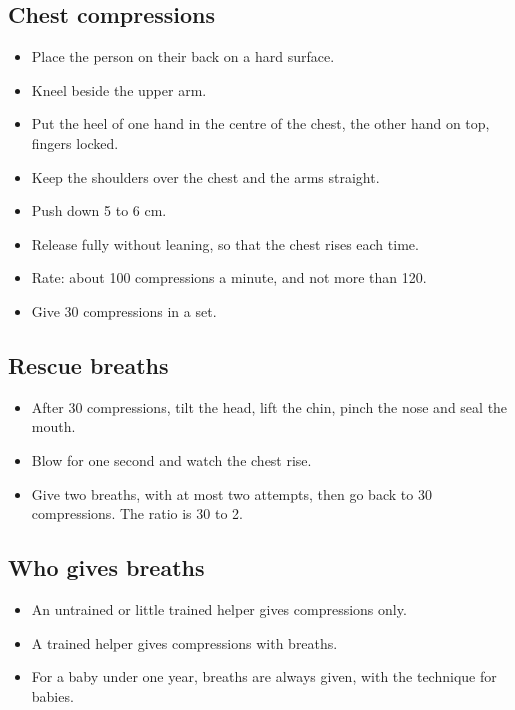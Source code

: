 \subsection*{Chest compressions}

\begin{itemize}
\item Place the person on their back on a hard surface.
\item Kneel beside the upper arm.
\item Put the heel of one hand in the centre of the chest, the other hand on top, fingers locked.
\item Keep the shoulders over the chest and the arms straight.
\item Push down 5 to 6 cm.
\item Release fully without leaning, so that the chest rises each time.
\item Rate: about 100 compressions a minute, and not more than 120.
\item Give 30 compressions in a set.
\end{itemize}

\subsection*{Rescue breaths}

\begin{itemize}
\item After 30 compressions, tilt the head, lift the chin, pinch the nose and seal the mouth.
\item Blow for one second and watch the chest rise.
\item Give two breaths, with at most two attempts, then go back to 30 compressions. The ratio is 30 to 2.
\end{itemize}

\subsection*{Who gives breaths}

\begin{itemize}
\item An untrained or little trained helper gives compressions only.
\item A trained helper gives compressions with breaths.
\item For a baby under one year, breaths are always given, with the technique for babies.
\end{itemize}

